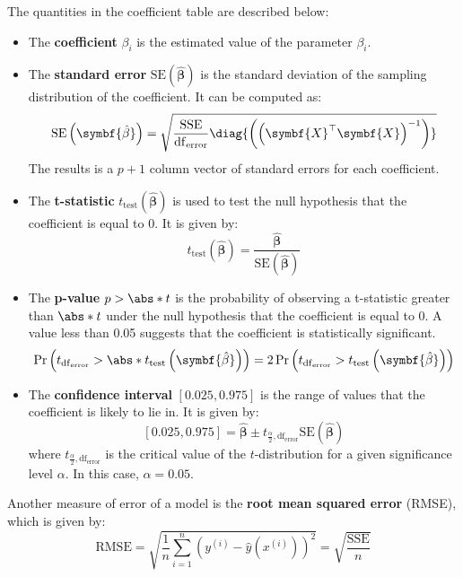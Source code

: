 \documentclass{article}
\begin{document}
The quantities in the coefficient table are described below:
\begin{itemize}
    \item The \textbf{coefficient} \(\beta_i\) is the estimated value
          of the parameter \(\beta_i\).
    \item The \textbf{standard error} \(\mathrm{SE}\left(
          \symbf{\hat{\beta}} \right)\) is the standard deviation of
          the sampling distribution of the coefficient. It can be
          computed as:
          \begin{equation*}
              \mathrm{SE}\left( \symbf{\hat{\beta}} \right) = \sqrt{\frac{\mathrm{SSE}}{\mathrm{df}_{\mathrm{error}}} \diag{\left( \left( \symbf{X}^\top \symbf{X} \right)^{-1} \right)}}
          \end{equation*}
          The results is a \(p + 1\) column vector of standard errors for each
          coefficient.
    \item The \textbf{t-statistic} \(t_{\mathrm{test}}\left(
          \symbf{\hat{\beta}} \right)\) is used to test the null
          hypothesis that the coefficient is equal to 0. It is given
          by:
          \begin{equation*}
              t_{\mathrm{test}}\left( \symbf{\hat{\beta}} \right) = \frac{\symbf{\hat{\beta}}}{\mathrm{SE}\left( \symbf{\hat{\beta}} \right)}
          \end{equation*}
    \item The \textbf{p-value} \(p > \abs*{t}\) is the probability of
          observing a t-statistic greater than \(\abs*{t}\) under the
          null hypothesis that the coefficient is equal to 0. A value
          less than 0.05 suggests that the coefficient is statistically
          significant.
          \begin{equation*}
              \Pr{\left( t_{\mathrm{df}_{\mathrm{error}}} > \abs*{t_{\mathrm{test}}\left( \symbf{\hat{\beta}} \right)} \right)} = 2 \Pr{\left( t_{\mathrm{df}_{\mathrm{error}}} > t_{\mathrm{test}}\left( \symbf{\hat{\beta}} \right) \right)}
          \end{equation*}
    \item The \textbf{confidence interval} \(\left[0.025,
          0.975\right]\) is the range of values that the coefficient is
          likely to lie in. It is given by:
          \begin{equation*}
              \left[0.025, 0.975\right] = \symbf{\hat{\beta}} \pm t_{\frac{\alpha}{2}, \mathrm{df}_{\mathrm{error}}} \mathrm{SE}\left( \symbf{\hat{\beta}} \right)
          \end{equation*}
          where \(t_{\frac{\alpha}{2}, \mathrm{df}_{\mathrm{error}}}\) is the critical
          value of the \(t\)-distribution for a given significance level
          \(\alpha\). In this case, \(\alpha = 0.05\).
\end{itemize}
Another measure of error of a model is the \textbf{root mean squared
    error} (RMSE), which is given by:
\begin{equation*}
    \mathrm{RMSE} = \sqrt{\frac{1}{n} \sum_{i = 1}^n {\left( y^{\left( i \right)} - \hat{y}\left( x^{\left( i \right)} \right) \right)}^2} = \sqrt{\frac{\mathrm{SSE}}{n}}
\end{equation*}
\end{document}
